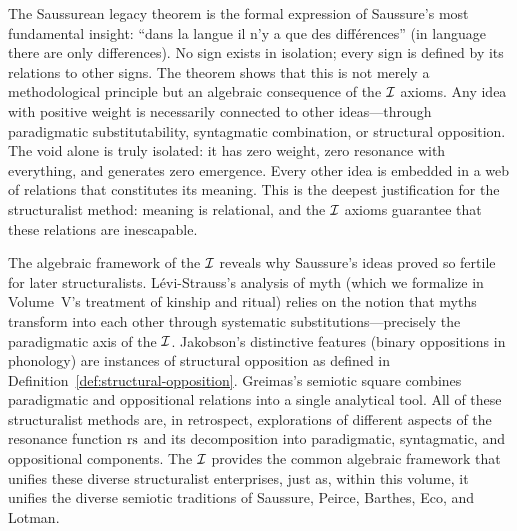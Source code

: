 \begin{interpretation}
The Saussurean legacy theorem is the formal expression of Saussure's most fundamental insight: ``dans la langue il n'y a que des diff\'erences'' (in language there are only differences). No sign exists in isolation; every sign is defined by its relations to other signs. The theorem shows that this is not merely a methodological principle but an algebraic consequence of the $\mathcal{I}$ axioms. Any idea with positive weight is necessarily connected to other ideas---through paradigmatic substitutability, syntagmatic combination, or structural opposition. The void alone is truly isolated: it has zero weight, zero resonance with everything, and generates zero emergence. Every other idea is embedded in a web of relations that constitutes its meaning. This is the deepest justification for the structuralist method: meaning is relational, and the $\mathcal{I}$ axioms guarantee that these relations are inescapable.
\end{interpretation}

\begin{remark}
The algebraic framework of the $\mathcal{I}$ reveals why Saussure's ideas proved so fertile for later structuralists. L\'evi-Strauss's analysis of myth (which we formalize in Volume~V's treatment of kinship and ritual) relies on the notion that myths transform into each other through systematic substitutions---precisely the paradigmatic axis of the $\mathcal{I}$. Jakobson's distinctive features (binary oppositions in phonology) are instances of structural opposition as defined in Definition~\ref{def:structural-opposition}. Greimas's semiotic square combines paradigmatic and oppositional relations into a single analytical tool. All of these structuralist methods are, in retrospect, explorations of different aspects of the resonance function $\mathrm{rs}$ and its decomposition into paradigmatic, syntagmatic, and oppositional components. The $\mathcal{I}$ provides the common algebraic framework that unifies these diverse structuralist enterprises, just as, within this volume, it unifies the diverse semiotic traditions of Saussure, Peirce, Barthes, Eco, and Lotman.
\end{remark}

